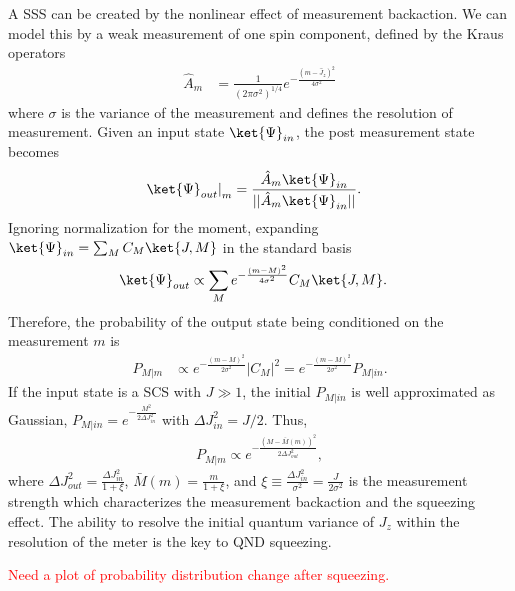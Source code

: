 \documentclass[]{report}
\begin{document}
A SSS can be created by the nonlinear effect of measurement backaction. We can model this by a weak measurement of one spin component, defined by the Kraus operators
\begin{align}\label{KrausOpSq}
\hat{A}_m &= \frac{1}{(2\pi \sigma^2)^{1/4}} e^{-\frac{(m-\hat{J}_z)^2}{4\sigma^2}}
\end{align}
where $ \sigma  $ is the variance of the measurement and defines the resolution of measurement. Given an input state $ \ket{\Psi}_{in} $, the post measurement state becomes
\begin{align}
\left. \ket{\Psi}_{out} \right|_m &= \frac{\hat{A}_m\ket{\Psi}_{in}}{||\hat{A}_m\ket{\Psi}_{in}|| }. 
\end{align}
Ignoring normalization for the moment, expanding $ \ket{\Psi}_{in} = \sum_M C_{M} \ket{J,M} $ in the standard basis
\begin{align}
\ket{\Psi}_{out} &\propto \sum_M e^{-\frac{(m-M)^2}{4\sigma^2}} C_{M} \ket{J,M}.
\end{align}
Therefore, the probability of the output state being conditioned on the measurement $ m $ is 
\begin{align}
P_{M|m} &\propto  e^{-\frac{(m-M)^2}{2\sigma^2}} |C_{M}|^2 = e^{-\frac{(m-M)^2}{2\sigma^2}} P_{M|in}.
\end{align}
If the input state is a SCS with $ J\gg 1 $, the initial $ P_{M|in} $ is well approximated as Gaussian, $ P_{M|in}=e^{-\frac{M^2}{2\Delta J_{in}^2}} $ with $ \Delta J_{in}^2=J/2 $. Thus,
\begin{align}
P_{M|m} \propto e^{-\frac{(M-\bar{M}(m))^2}{2\Delta J_{out}^2}},
\end{align}
where $ \Delta J_{out}^2 =\frac{\Delta J_{in}^2}{1+\xi} $, $ \bar{M}(m)=\frac{m}{1+\xi} $, and $ \xi\equiv \frac{\Delta J_{in}^2}{\sigma^2}=\frac{J}{2\sigma^2} $ is the measurement strength which characterizes the measurement backaction and the squeezing effect. The ability to resolve the initial quantum variance of $ J_z $ within the resolution of the meter is the key to QND squeezing. 

\textcolor{red}{Need a plot of probability distribution change after squeezing.}
\end{document}
